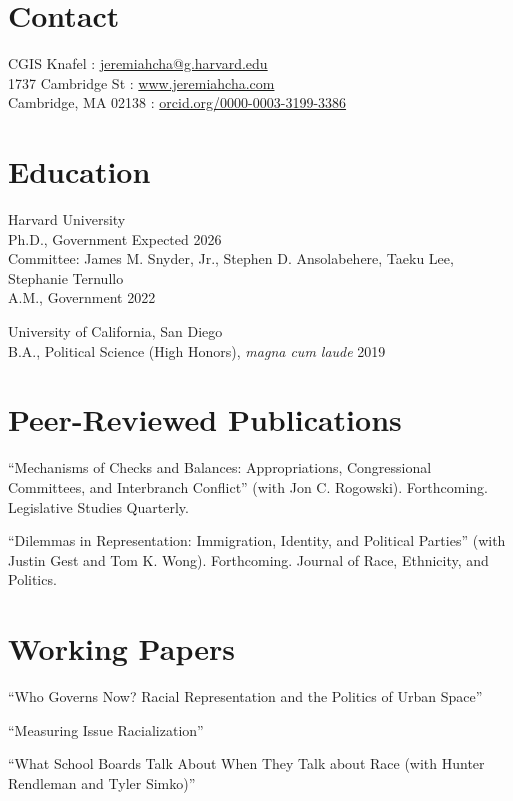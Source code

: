 \documentclass[margin, line]{res}
\begin{document}
\begin{resume}

\section{Contact}
CGIS Knafel \hfill \Letter: \href{mailto:jeremiahcha@g.harvard.edu}{jeremiahcha@g.harvard.edu}\\
1737 Cambridge St \hfill \Mundus: \href{httsp://www.jeremiahcha.com}{www.jeremiahcha.com}\\
Cambridge, MA 02138 \hfill \Mundus: \href{https://orcid.org/0000-0003-3199-3386}{orcid.org/0000-0003-3199-3386}

\section{Education}
Harvard University\\
\hspace*{5mm} Ph.D., Government \hfill Expected 2026\\
\hspace*{10mm} {\footnotesize Committee: James M. Snyder, Jr., Stephen D. Ansolabehere, Taeku Lee, Stephanie Ternullo}\\
\hspace*{5mm} A.M., Government \hfill 2022

University of California, San Diego\\
\hspace*{5mm} B.A., Political Science (High Honors), \textit{magna cum laude} \hfill 2019

\section{Peer-Reviewed Publications}
\begin{etaremune}
	\item ``Mechanisms of Checks and Balances: Appropriations, Congressional Committees, and Interbranch Conflict'' (with Jon C. Rogowski). Forthcoming. Legislative Studies Quarterly.
	\item ``Dilemmas in Representation: Immigration, Identity, and Political Parties'' (with Justin Gest and Tom K. Wong). Forthcoming. Journal of Race, Ethnicity, and Politics. 
\end{etaremune}



\section{Working Papers}
\begin{etaremune}
	\item ``Who Governs Now? Racial Representation and the Politics of Urban Space''
	\item ``Measuring Issue Racialization''
	\item ``What School Boards Talk About When They Talk about Race (with Hunter Rendleman and Tyler Simko)'' 
\end{etaremune}


\end{resume}
\end{document}
